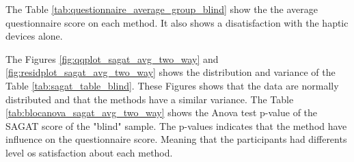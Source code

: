 The Table \ref{tab:questionnaire_average_group_blind} show the the average questionnaire score on each method. It also shows a disatisfaction with the haptic devices alone.



The Figures \ref{fig:qqplot_sagat_avg_two_way} and \ref{fig:residplot_sagat_avg_two_way} shows the distribution and variance of the Table \ref{tab:sagat_table_blind}. These Figures shows that the data are normally distributed and that the methods have a similar variance.
The Table \ref{tab:blocanova_sagat_avg_two_way} shows the Anova test p-value of the SAGAT score of the "blind" sample. The p-values indicates that the method have influence on the questionnaire score. Meaning that the participants had differents level os satisfaction about each method.



